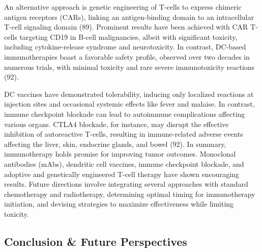 \documentclass[
]{article}
\begin{document}
An alternative approach is genetic engineering of T-cells to express
chimeric antigen receptors (CARs), linking an antigen-binding domain to
an intracellular T-cell signaling domain (89). Prominent results have
been achieved with CAR T-cells targeting CD19 in B-cell malignancies,
albeit with significant toxicity, including cytokine-release syndrome
and neurotoxicity. In contrast, DC-based immunotherapies boast a
favorable safety profile, observed over two decades in numerous trials,
with minimal toxicity and rare severe immunotoxicity reactions (92).

DC vaccines have demonstrated tolerability, inducing only localized
reactions at injection sites and occasional systemic effects like fever
and malaise. In contrast, immune checkpoint blockade can lead to
autoimmune complications affecting various organs. CTLA4 blockade, for
instance, may disrupt the effective inhibition of autoreactive T-cells,
resulting in immune-related adverse events affecting the liver, skin,
endocrine glands, and bowel (92). In summary, immunotherapy holds
promise for improving tumor outcomes. Monoclonal antibodies (mAbs),
dendritic cell vaccines, immune checkpoint blockade, and adoptive and
genetically engineered T-cell therapy have shown encouraging results.
Future directions involve integrating several approaches with standard
chemotherapy and radiotherapy, determining optimal timing for
immunotherapy initiation, and devising strategies to maximize
effectiveness while limiting toxicity.

\subsection{Conclusion \& Future
Perspectives}\label{conclusion-future-perspectives}
\end{document}
